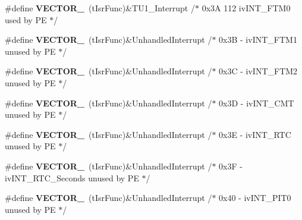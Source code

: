\begin{DoxyCompactItemize}
\item 
\#define {\bfseries V\+E\+C\+T\+O\+R\+\_}~(t\+Isr\+Func)\&T\+U1\+\_\+\+Interrupt              /$\ast$ 0x3\+A 112  iv\+I\+N\+T\+\_\+\+F\+T\+M0                     used by P\+E $\ast$/\hypertarget{group___vectors___config__module_gab869c8d0cbe648552220094006fc1f73}{}\label{group___vectors___config__module_gab869c8d0cbe648552220094006fc1f73}

\item 
\#define {\bfseries V\+E\+C\+T\+O\+R\+\_}~(t\+Isr\+Func)\&Unhandled\+Interrupt         /$\ast$ 0x3\+B -\/    iv\+I\+N\+T\+\_\+\+F\+T\+M1                     unused by P\+E $\ast$/\hypertarget{group___vectors___config__module_ga764e27376f306de67b7164bcf558c31e}{}\label{group___vectors___config__module_ga764e27376f306de67b7164bcf558c31e}

\item 
\#define {\bfseries V\+E\+C\+T\+O\+R\+\_}~(t\+Isr\+Func)\&Unhandled\+Interrupt         /$\ast$ 0x3\+C -\/    iv\+I\+N\+T\+\_\+\+F\+T\+M2                     unused by P\+E $\ast$/\hypertarget{group___vectors___config__module_ga3340e193e95bf91be8c1acc05a88fdda}{}\label{group___vectors___config__module_ga3340e193e95bf91be8c1acc05a88fdda}

\item 
\#define {\bfseries V\+E\+C\+T\+O\+R\+\_}~(t\+Isr\+Func)\&Unhandled\+Interrupt         /$\ast$ 0x3\+D -\/    iv\+I\+N\+T\+\_\+\+C\+M\+T                      unused by P\+E $\ast$/\hypertarget{group___vectors___config__module_ga1795f3c3aa0170f3a3b821bd6df54f3f}{}\label{group___vectors___config__module_ga1795f3c3aa0170f3a3b821bd6df54f3f}

\item 
\#define {\bfseries V\+E\+C\+T\+O\+R\+\_}~(t\+Isr\+Func)\&Unhandled\+Interrupt         /$\ast$ 0x3\+E -\/    iv\+I\+N\+T\+\_\+\+R\+T\+C                      unused by P\+E $\ast$/\hypertarget{group___vectors___config__module_ga5423145a459e760cd5f1b5d384aabb33}{}\label{group___vectors___config__module_ga5423145a459e760cd5f1b5d384aabb33}

\item 
\#define {\bfseries V\+E\+C\+T\+O\+R\+\_}~(t\+Isr\+Func)\&Unhandled\+Interrupt         /$\ast$ 0x3\+F -\/    iv\+I\+N\+T\+\_\+\+R\+T\+C\+\_\+\+Seconds              unused by P\+E $\ast$/\hypertarget{group___vectors___config__module_gaeba2225b5183d8a5ebb2f71a1a9b26f7}{}\label{group___vectors___config__module_gaeba2225b5183d8a5ebb2f71a1a9b26f7}

\item 
\#define {\bfseries V\+E\+C\+T\+O\+R\+\_}~(t\+Isr\+Func)\&Unhandled\+Interrupt         /$\ast$ 0x40 -\/    iv\+I\+N\+T\+\_\+\+P\+I\+T0                     unused by P\+E $\ast$/\hypertarget{group___vectors___config__module_ga995e1029ff294bd72a3b65712839e405}{}\label{group___vectors___config__module_ga995e1029ff294bd72a3b65712839e405}


\end{DoxyCompactItemize}
